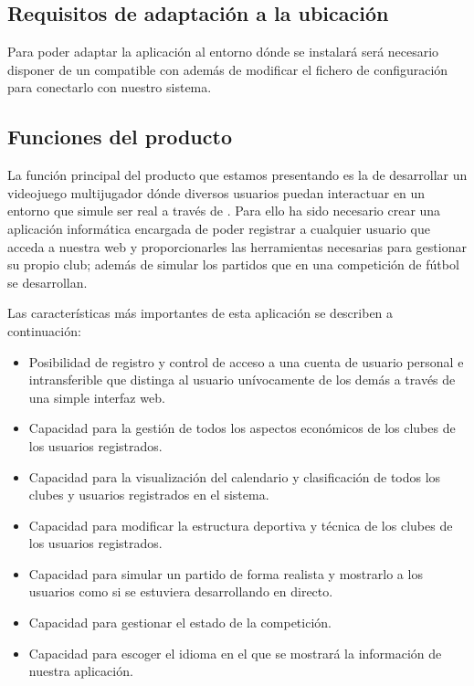\subsection{Requisitos de adaptación a la ubicación}
Para poder adaptar la aplicación al entorno dónde se instalará será necesario
disponer de un  compatible con  además de modificar
el fichero de configuración para conectarlo con nuestro sistema.

\subsection{Funciones del producto}
La función principal del producto que estamos presentando es la de desarrollar
un videojuego multijugador dónde diversos usuarios puedan interactuar en un
entorno que simule ser real a través de .  Para ello ha sido
necesario crear una aplicación informática encargada de poder registrar a
cualquier usuario que acceda a nuestra web y proporcionarles las herramientas
necesarias para gestionar su propio club; además de simular los partidos que en
una competición de fútbol se desarrollan.

Las características más importantes de esta aplicación se describen a
continuación:

\begin{itemize}
\item Posibilidad de registro y control de acceso a una cuenta de usuario
  personal e intransferible que distinga al usuario unívocamente de los demás a
  través de una simple interfaz web.
\item Capacidad para la gestión de todos los aspectos económicos de los clubes
  de los usuarios registrados.
\item Capacidad para la visualización del calendario y clasificación de todos
  los clubes y usuarios registrados en el sistema.
\item Capacidad para modificar la estructura deportiva y técnica de los clubes
  de los usuarios registrados.
\item Capacidad para simular un partido de forma realista y mostrarlo a los
  usuarios como si se estuviera desarrollando en directo.
\item Capacidad para gestionar el estado de la competición.
\item Capacidad para escoger el idioma en el que se mostrará la información de
  nuestra aplicación.
\end{itemize}

